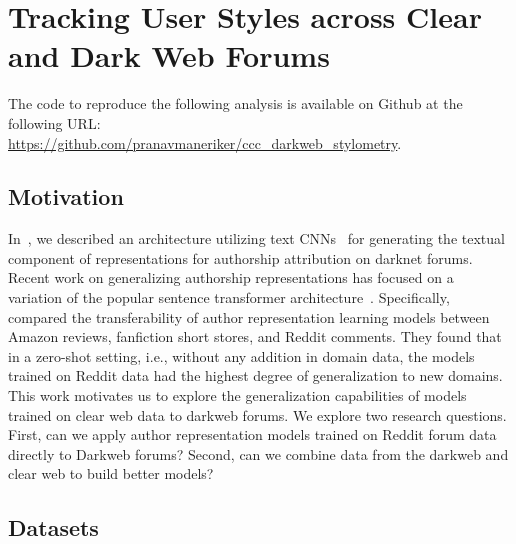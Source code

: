 \section{Tracking User Styles across Clear and Dark Web Forums}
\label{chp:stylometry_extensions:followingTrail}
The code to reproduce the following analysis is available on Github at the following URL:\\
 {\url{https://github.com/pranavmaneriker/ccc_darkweb_stylometry}}.

\subsection{Motivation}
\label{chp:stylometry_extensions:followingTrail:motivation}
In~, we described an architecture utilizing text CNNs~\citep{kim2014convolutional} for generating the textual component of representations for authorship attribution on darknet forums.
Recent work on generalizing authorship representations has focused on a variation of the popular sentence transformer architecture~\citep{reimers2019sentencebert}.
Specifically, \citet{riverastao2021learning} compared the transferability of author representation learning models between Amazon reviews, fanfiction short stores, and Reddit comments.
They found that in a zero-shot setting, i.e., without any addition in domain data, the models trained on Reddit data had the highest degree of generalization to new domains.
This work motivates us to explore the generalization capabilities of models trained on clear web data to darkweb forums.
We explore two research questions.
First, can we apply author representation models trained on Reddit forum data directly to Darkweb forums?
Second, can we combine data from the darkweb and clear web to build better models?

\subsection{Datasets}
\label{chp:stylometry_extensions:followingTrail:datasets}

